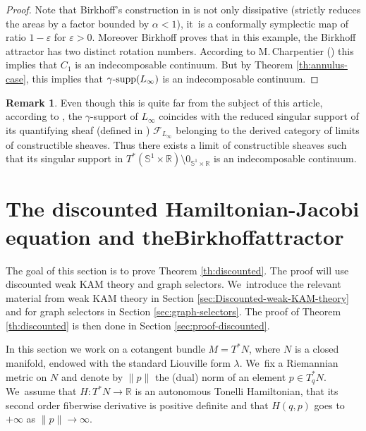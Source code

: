 \documentclass[JEP,XML,SOM,Unicode,NoFloatCountersInSection,published]{cedram}
\theoremstyle{definition}
\newtheorem{rem}[thm]{Remark}
\newcommand{\F}{{\mathcal F}}
\newcommand{\R}{\mathbb{R}}
\DeclareMathOperator{\gammasupp}{\gamma\textup{-supp}}
\begin{document}
\begin{proof} Note that Birkhoff's construction in \cite[\S7]{Birkhoff-attractor} is not only dissipative (\ie strictly reduces the areas by a factor bounded by $\alpha <1$), it~is a conformally symplectic map of ratio $1- \varepsilon $ for $ \varepsilon >0$. Moreover Birkhoff proves that in this example, the Birkhoff attractor has two distinct rotation numbers. According to M.\,Charpentier (\cite{Charpentier-1}) this implies that $C_{1}$ is an indecomposable continuum.
But by Theorem \ref{th:annulus-case}, this implies that $\gammasupp(L_{\infty})$ is an indecomposable continuum.
\end{proof}
\begin{rem}
Even though this is quite far from the subject of this article, according to \cite{AGHIV}, the $\gamma$\nobreakdash-support of $L_{\infty}$ coincides with the reduced singular support of its quantifying sheaf (defined in \cite{Guillermou-Viterbo}) $\F_{L_{\infty}}$ belonging to the derived category of limits of constructible sheaves. Thus there exists a limit of constructible sheaves such that its singular support in $T^{*}({\mathbb S}^{1}\times {\mathbb R})\setminus 0_{{\mathbb S}^{1}\times {\mathbb R}}$ is an indecomposable continuum.
\end{rem}

\section{The discounted Hamiltonian-Jacobi equation and the\nobreakspace Birkhoff\nobreakspace attractor}\label{sec:HJ}

The goal of this section is to prove Theorem \ref{th:discounted}. The proof will use discounted weak KAM theory and graph selectors. We~introduce the relevant material from weak KAM theory in Section \ref{sec:Discounted-weak-KAM-theory} and for graph selectors in Section \ref{sec:graph-selectors}. The proof of Theorem \ref{th:discounted} is then done in Section \ref{sec:proof-discounted}.

In this section we work on a cotangent bundle $M=T^*N$, where $N$ is a closed manifold, endowed with the standard Liouville form $\lambda$. We~fix a Riemannian metric on $N$ and denote by $\| p\|$ the (dual) norm of an element $p\in T^*_qN$. We~assume that $H:T^*N\to \R$ is an autonomous Tonelli Hamiltonian, \ie that its second order fiberwise derivative
is positive definite and that $H(q,p)$ goes to $+\infty$ as $\|p\|\to\infty$.
\end{document}
